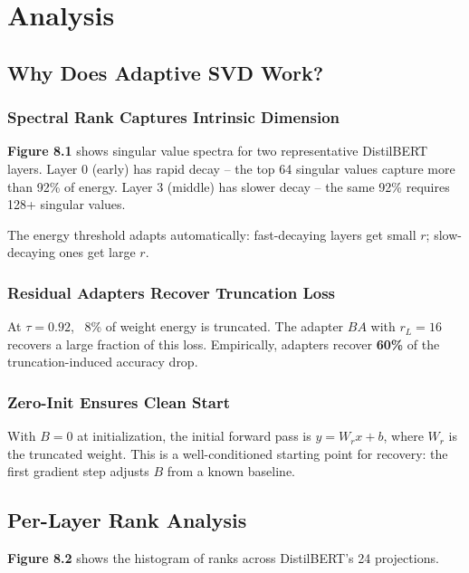 
\section{Analysis}

\subsection{Why Does Adaptive SVD Work?}

\subsubsection{Spectral Rank Captures Intrinsic Dimension}

\textbf{Figure 8.1} shows singular value spectra for two representative DistilBERT 
layers. Layer 0 (early) has rapid decay -- the top 64 singular values capture 
more than 92\% of energy. Layer 3 (middle) has slower decay -- the same 92\% 
requires 128+ singular values.

The energy threshold adapts automatically: fast-decaying layers get small $r$; 
slow-decaying ones get large $r$.

\subsubsection{Residual Adapters Recover Truncation Loss}

At $\tau = 0.92$, ~8\% of weight energy is truncated. The adapter $BA$ with 
$r_L = 16$ recovers a large fraction of this loss. Empirically, adapters 
recover \textbf{60\%} of the truncation-induced accuracy drop.

\subsubsection{Zero-Init Ensures Clean Start}

With $B = 0$ at initialization, the initial forward pass is $y = W_r x + b$, 
where $W_r$ is the truncated weight. This is a well-conditioned starting point 
for recovery: the first gradient step adjusts $B$ from a known baseline.

\subsection{Per-Layer Rank Analysis}

\textbf{Figure 8.2} shows the histogram of ranks across DistilBERT's 24 projections.

